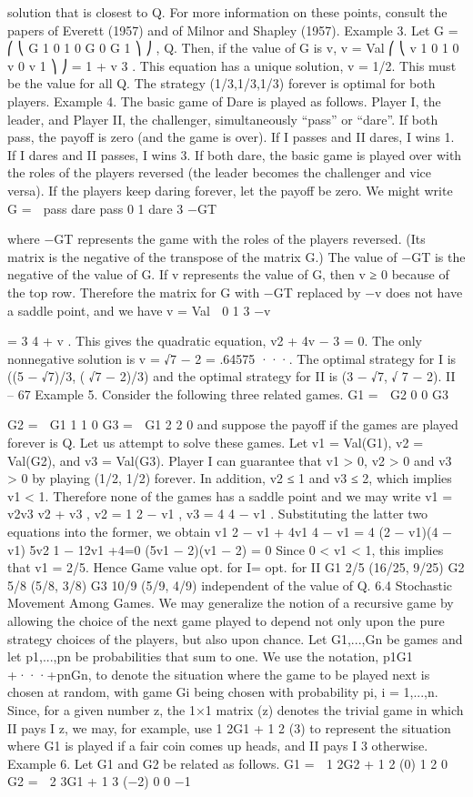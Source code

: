 solution that is closest to Q. For more information on these points, consult the papers of
Everett (1957) and of Milnor and Shapley (1957).
Example 3. Let
G =
⎛
⎝
G 1 0
1 0 G
0 G 1
⎞
⎠ , Q.
Then, if the value of G is v,
v = Val
⎛
⎝
v 1 0
1 0 v
0 v 1
⎞
⎠ = 1 + v
3 .
This equation has a unique solution, v = 1/2. This must be the value for all Q. The
strategy (1/3,1/3,1/3) forever is optimal for both players.
Example 4. The basic game of Dare is played as follows. Player I, the leader, and Player
II, the challenger, simultaneously “pass” or “dare”. If both pass, the payoff is zero (and
the game is over). If I passes and II dares, I wins 1. If I dares and II passes, I wins 3. If
both dare, the basic game is played over with the roles of the players reversed (the leader
becomes the challenger and vice versa). If the players keep daring forever, let the payoff
be zero. We might write
G =

pass dare
pass 0 1
dare 3 −GT

where −GT represents the game with the roles of the players reversed. (Its matrix is the
negative of the transpose of the matrix G.) The value of −GT is the negative of the value
of G.
If v represents the value of G, then v ≥ 0 because of the top row. Therefore the matrix
for G with −GT replaced by −v does not have a saddle point, and we have
v = Val  0 1
3 −v

= 3
4 + v
.
This gives the quadratic equation, v2 + 4v − 3 = 0. The only nonnegative solution is
v = √7 − 2 = .64575 ···. The optimal strategy for I is ((5 − √7)/3, (
√7 − 2)/3) and the
optimal strategy for II is (3 − √7,
√
7 − 2).
II – 67
Example 5. Consider the following three related games.
G1 =
 G2 0
0 G3

G2 =
 G1 1
1 0
G3 =
 G1 2
2 0
and suppose the payoff if the games are played forever is Q. Let us attempt to solve these
games. Let v1 = Val(G1), v2 = Val(G2), and v3 = Val(G3). Player I can guarantee that
v1 > 0, v2 > 0 and v3 > 0 by playing (1/2, 1/2) forever. In addition, v2 ≤ 1 and v3 ≤ 2,
which implies v1 < 1. Therefore none of the games has a saddle point and we may write
v1 = v2v3
v2 + v3
, v2 = 1
2 − v1
, v3 = 4
4 − v1
.
Substituting the latter two equations into the former, we obtain
v1
2 − v1
+
4v1
4 − v1
= 4
(2 − v1)(4 − v1)
5v2
1 − 12v1 +4=0
(5v1 − 2)(v1 − 2) = 0
Since 0 < v1 < 1, this implies that v1 = 2/5. Hence
Game value opt. for I= opt. for II
G1 2/5 (16/25, 9/25)
G2 5/8 (5/8, 3/8)
G3 10/9 (5/9, 4/9)
independent of the value of Q.
6.4 Stochastic Movement Among Games. We may generalize the notion of a
recursive game by allowing the choice of the next game played to depend not only upon the
pure strategy choices of the players, but also upon chance. Let G1,...,Gn be games and
let p1,...,pn be probabilities that sum to one. We use the notation, p1G1 +···+pnGn, to
denote the situation where the game to be played next is chosen at random, with game Gi
being chosen with probability pi, i = 1,...,n. Since, for a given number z, the 1×1 matrix
(z) denotes the trivial game in which II pays I z, we may, for example, use 1
2G1 + 1
2 (3) to
represent the situation where G1 is played if a fair coin comes up heads, and II pays I 3
otherwise.
Example 6. Let G1 and G2 be related as follows.
G1 =
 1
2G2 + 1
2 (0) 1
2 0
G2 =
 2
3G1 + 1
3 (−2) 0
0 −1

